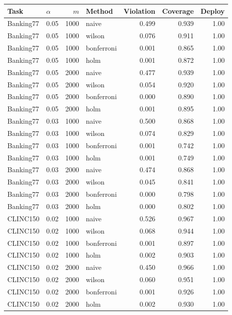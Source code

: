 \begin{tabular}{llrlrrr}
\toprule
Task & $\alpha$ & $m$ & Method & Violation & Coverage & Deploy \\
\midrule
Banking77 & 0.05 & 1000 & naive & 0.499 & 0.939 & 1.00 \\
Banking77 & 0.05 & 1000 & wilson & 0.076 & 0.911 & 1.00 \\
Banking77 & 0.05 & 1000 & bonferroni & 0.001 & 0.865 & 1.00 \\
Banking77 & 0.05 & 1000 & holm & 0.001 & 0.872 & 1.00 \\
Banking77 & 0.05 & 2000 & naive & 0.477 & 0.939 & 1.00 \\
Banking77 & 0.05 & 2000 & wilson & 0.054 & 0.920 & 1.00 \\
Banking77 & 0.05 & 2000 & bonferroni & 0.000 & 0.890 & 1.00 \\
Banking77 & 0.05 & 2000 & holm & 0.001 & 0.895 & 1.00 \\
Banking77 & 0.03 & 1000 & naive & 0.500 & 0.868 & 1.00 \\
Banking77 & 0.03 & 1000 & wilson & 0.074 & 0.829 & 1.00 \\
Banking77 & 0.03 & 1000 & bonferroni & 0.001 & 0.742 & 1.00 \\
Banking77 & 0.03 & 1000 & holm & 0.001 & 0.749 & 1.00 \\
Banking77 & 0.03 & 2000 & naive & 0.474 & 0.868 & 1.00 \\
Banking77 & 0.03 & 2000 & wilson & 0.045 & 0.841 & 1.00 \\
Banking77 & 0.03 & 2000 & bonferroni & 0.000 & 0.798 & 1.00 \\
Banking77 & 0.03 & 2000 & holm & 0.000 & 0.802 & 1.00 \\
CLINC150 & 0.02 & 1000 & naive & 0.526 & 0.967 & 1.00 \\
CLINC150 & 0.02 & 1000 & wilson & 0.068 & 0.944 & 1.00 \\
CLINC150 & 0.02 & 1000 & bonferroni & 0.001 & 0.897 & 1.00 \\
CLINC150 & 0.02 & 1000 & holm & 0.002 & 0.903 & 1.00 \\
CLINC150 & 0.02 & 2000 & naive & 0.450 & 0.966 & 1.00 \\
CLINC150 & 0.02 & 2000 & wilson & 0.060 & 0.951 & 1.00 \\
CLINC150 & 0.02 & 2000 & bonferroni & 0.001 & 0.926 & 1.00 \\
CLINC150 & 0.02 & 2000 & holm & 0.002 & 0.930 & 1.00 \\
\bottomrule
\end{tabular}
